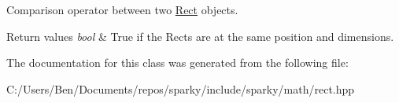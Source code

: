 Comparison operator between two \hyperlink{classsparky_1_1_rect}{Rect} objects. 


\begin{DoxyRetVals}{Return values}
{\em bool} & True if the Rects are at the same position and dimensions. \\
\hline
\end{DoxyRetVals}


The documentation for this class was generated from the following file\+:\begin{DoxyCompactItemize}
\item 
C\+:/\+Users/\+Ben/\+Documents/repos/sparky/include/sparky/math/rect.\+hpp\end{DoxyCompactItemize}
